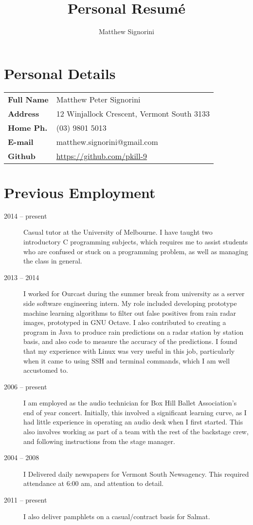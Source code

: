 \documentclass[a4paper]{article}
\title{Personal Resum\'e}
\author{Matthew Signorini}
\begin{document}
\maketitle

\section{Personal Details}
\begin{tabular}{>{\raggedright}m{3cm} l}
    \textbf{Full Name} &Matthew Peter Signorini\\
 \textbf{Address} &12 Winjallock Crescent, Vermont South 3133\\
\textbf{Home Ph.} &(03) 9801 5013\\
  \textbf{E-mail} &matthew.signorini@gmail.com\\
    \textbf{Github} &\url{https://github.com/pkill-9}
\end{tabular}


\section{Previous Employment}
\begin{description}
    \item[2014 -- present] Casual tutor at the University of Melbourne. I
        have taught two introductory C programming subjects, which requires
        me to assist students who are confused or stuck on a programming
        problem, as well as managing the class in general.
    \item[2013 -- 2014] I worked for Ourcast during the summer break from
        university as a server side software engineering intern. My role
        included developing prototype machine learning algorithms to filter
        out false positives from rain radar images, prototyped in GNU 
        Octave. I also contributed to creating a program in Java to produce
        rain predictions on a radar station by station basis, and also code
        to measure the accuracy of the predictions. I found that my
        experience with Linux was very useful in this job, particularly when
        it came to using SSH and terminal commands, which I am well accustomed
        to.
    \item[2006 -- present] I am employed as the audio technician for Box
        Hill Ballet Association's end of year concert. Initially, this 
        involved a significant learning curve, as I had little experience 
        in operating an audio desk when I first started. This also involves 
        working as part of a team with the rest of the backstage crew, and
        following instructions from the stage manager.
    \item[2004 -- 2008] I Delivered daily newspapers for Vermont South
        Newsagency. This required attendance at 6:00 am, and attention to
        detail.
    \item[2011 -- present] I also deliver pamphlets on a casual/contract
        basis for Salmat.
\end{description}
\end{document}
